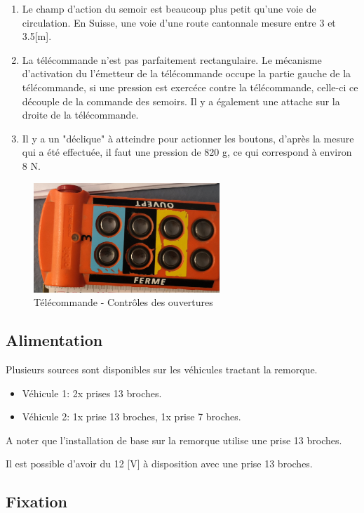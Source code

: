 \begin{enumerate}
    \item{Le champ d'action du semoir est beaucoup plus petit qu'une voie de circulation. En Suisse, une voie d'une route cantonnale mesure entre 3 et 3.5[m].}
    \item{La télécommande n'est pas parfaitement rectangulaire. Le mécanisme d'activation du l'émetteur de la télécommande occupe la partie gauche de la télécommande,
                si une pression est exercéce contre la télécommande, celle-ci ce découple de la commande des semoirs. Il y a également une attache sur la droite de la télécommande.}
    \item{Il y a un "déclique" à atteindre pour actionner les boutons, d'après la mesure qui a été effectuée, il faut une pression de 820 \si{\gram}, ce qui correspond à environ 8 \si{\newton}}.
\end{enumerate}

\begin{figure}[H]
    \centering
    \includegraphics[width=7cm]{assets/figures/telecommande2.jpg}
    \caption{Télécommande - Contrôles des ouvertures}
\end{figure}

\subsection{Alimentation}
Plusieurs sources sont disponibles sur les véhicules tractant la remorque.
\begin{itemize}
    \item{Véhicule 1: 2x prises 13 broches.}
    \item{Véhicule 2: 1x prise 13 broches, 1x prise 7 broches.}
\end{itemize}
A noter que l'installation de base sur la remorque utilise une prise 13 broches.

Il est possible d'avoir du 12 [V] à disposition avec une prise 13 broches.

\subsection{Fixation}
